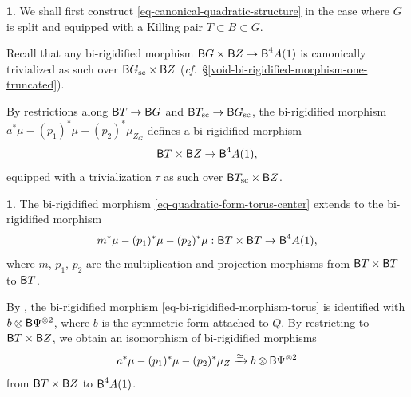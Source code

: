 \documentclass[10pt,english,reqno]{amsart}
\newcommand{\deloop}{\textnormal{\textsf{B}}}
\newcommand{\sconn}{\textnormal{sc}}
\theoremstyle{definition}
\numberwithin{equation}{section}
\newtheorem{untitledsubsubsection}[subsubsection]{}
\newenvironment{void}
{\begin{untitledsubsubsection}}
{\end{untitledsubsubsection}}
\begin{document}
\begin{void}
We shall first construct \eqref{eq-canonical-quadratic-structure} in the case where $G$ is split and equipped with a Killing pair $T \subset B\subset G$.

Recall that any bi-rigidified morphism $\deloop G \times \deloop Z \rightarrow \deloop^4A(1)$ is canonically trivialized as such over $\deloop G_{\sconn} \times \deloop Z$ (\emph{cf.}~\S\ref{void-bi-rigidified-morphism-one-truncated}).

By restrictions along $\deloop T \rightarrow \deloop G$ and $\deloop T_{\sconn} \rightarrow \deloop G_{\sconn}$, the bi-rigidified morphism $a^*\mu - (p_1)^*\mu - (p_2)^*\mu_{Z_G}$ defines a bi-rigidified morphism
\begin{equation}
\label{eq-quadratic-form-torus-center}
\deloop T \times \deloop Z \rightarrow \deloop^4A(1),
\end{equation}
equipped with a trivialization $\tau$ as such over $\deloop T_{\sconn} \times \deloop Z$. 
\end{void}


\begin{void}
The bi-rigidified morphism \eqref{eq-quadratic-form-torus-center} extends to the bi-rigidified morphism
\begin{equation}
\label{eq-bi-rigidified-morphism-torus}
m^*\mu - (p_1)^*\mu - (p_2)^*\mu : \deloop T \times \deloop T \rightarrow \deloop^4A(1),
\end{equation}
where $m$, $p_1$, $p_2$ are the multiplication and projection morphisms from $\deloop T\times\deloop T$ to $\deloop T$.

By \cite[Proposition 4.7.3]{zhao2022metaplectic}, the bi-rigidified morphism \eqref{eq-bi-rigidified-morphism-torus} is identified with $b\otimes \deloop\Psi^{\otimes 2}$, where $b$ is the symmetric form attached to $Q$. By restricting to $\deloop T\times \deloop Z$, we obtain an isomorphism of bi-rigidified morphisms
\begin{equation}
\label{eq-quadratic-structure-torus-center}
a^*\mu - (p_1)^*\mu - (p_2)^*\mu_Z \xrightarrow{\simeq} b\otimes \deloop\Psi^{\otimes 2}
\end{equation}
from $\deloop T\times \deloop Z$ to $\deloop^4A(1)$.
\end{void}

\end{document}
